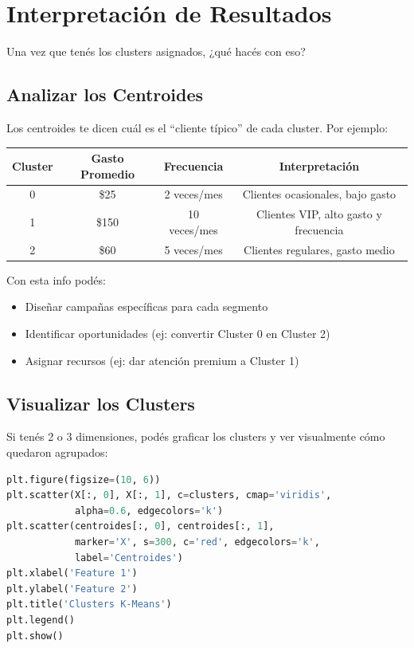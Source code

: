 \documentclass[12pt]{article}
\begin{document}
\section{Interpretación de Resultados}

Una vez que tenés los clusters asignados, ¿qué hacés con eso?

\subsection{Analizar los Centroides}

Los centroides te dicen cuál es el ``cliente típico'' de cada cluster. Por ejemplo:

\begin{table}[H]
    \centering
    \begin{tabular}{cccc}
        \toprule
        Cluster & Gasto Promedio & Frecuencia & Interpretación \\
        \midrule
        0 & \$25 & 2 veces/mes & Clientes ocasionales, bajo gasto \\
        1 & \$150 & 10 veces/mes & Clientes VIP, alto gasto y frecuencia \\
        2 & \$60 & 5 veces/mes & Clientes regulares, gasto medio \\
        \bottomrule
    \end{tabular}
\end{table}

Con esta info podés:
\begin{itemize}
    \item Diseñar campañas específicas para cada segmento
    \item Identificar oportunidades (ej: convertir Cluster 0 en Cluster 2)
    \item Asignar recursos (ej: dar atención premium a Cluster 1)
\end{itemize}

\subsection{Visualizar los Clusters}

Si tenés 2 o 3 dimensiones, podés graficar los clusters y ver visualmente cómo quedaron agrupados:

\begin{lstlisting}[language=Python]
plt.figure(figsize=(10, 6))
plt.scatter(X[:, 0], X[:, 1], c=clusters, cmap='viridis',
            alpha=0.6, edgecolors='k')
plt.scatter(centroides[:, 0], centroides[:, 1],
            marker='X', s=300, c='red', edgecolors='k',
            label='Centroides')
plt.xlabel('Feature 1')
plt.ylabel('Feature 2')
plt.title('Clusters K-Means')
plt.legend()
plt.show()
\end{lstlisting}
\end{document}
